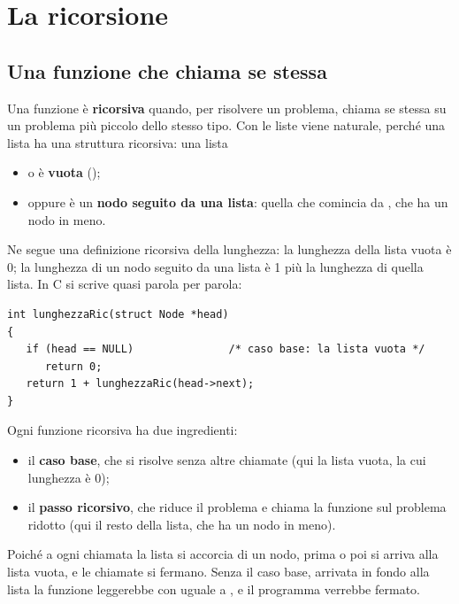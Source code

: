 \section{La ricorsione}

\subsection{Una funzione che chiama se stessa}

Una funzione è \textbf{ricorsiva} quando, per risolvere un problema, chiama
se stessa su un problema più piccolo dello stesso tipo. Con le liste viene
naturale, perché una lista ha una struttura ricorsiva: una lista

\begin{itemize}
  \item o è \textbf{vuota} ();
  \item oppure è un \textbf{nodo seguito da una lista}: quella che comincia
        da , che ha un nodo in meno.
\end{itemize}

Ne segue una definizione ricorsiva della lunghezza: la lunghezza della lista
vuota è 0; la lunghezza di un nodo seguito da una lista è 1 più la lunghezza
di quella lista. In C si scrive quasi parola per parola:

\begin{lstlisting}[style=c, name=ricorsione.c]
int lunghezzaRic(struct Node *head)
{
   if (head == NULL)               /* caso base: la lista vuota */
      return 0;
   return 1 + lunghezzaRic(head->next);
}
\end{lstlisting}

Ogni funzione ricorsiva ha due ingredienti:

\begin{itemize}
  \item il \textbf{caso base}, che si risolve senza altre chiamate (qui la
        lista vuota, la cui lunghezza è 0);
  \item il \textbf{passo ricorsivo}, che riduce il problema e chiama la
        funzione sul problema ridotto (qui il resto della lista, che ha un
        nodo in meno).
\end{itemize}

Poiché a ogni chiamata la lista si accorcia di un nodo, prima o poi si arriva
alla lista vuota, e le chiamate si fermano. Senza il caso base, arrivata in
fondo alla lista la funzione leggerebbe  con 
uguale a , e il programma verrebbe fermato.

